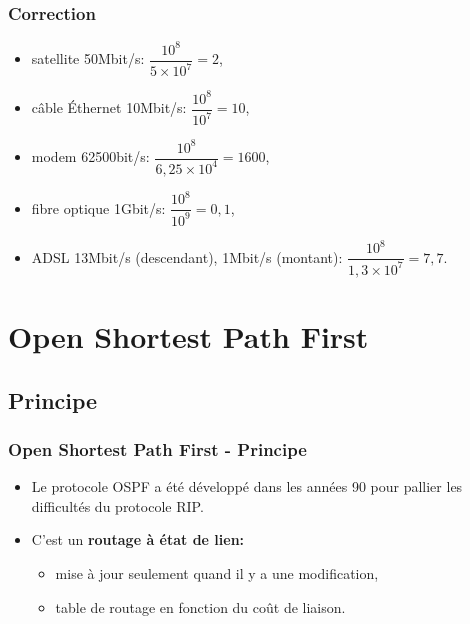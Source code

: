 \documentclass[svgnames,11pt]{beamer}
\begin{document}
\begin{frame}
    \frametitle{Correction}

    \begin{itemize}
        \item satellite 50Mbit/s: $\dfrac{10^8}{5×10^7}=2$,
        \item câble Éthernet 10Mbit/s: $\dfrac{10^8}{10^7}=10$,
        \item modem 62500bit/s: $\dfrac{10^8}{6,25×10^4}=1600$,
        \item fibre optique 1Gbit/s: $\dfrac{10^8}{10^9}=0,1$,
        \item ADSL 13Mbit/s (descendant), 1Mbit/s (montant): $\dfrac{10^8}{1,3×10^7}=7,7$.
    \end{itemize}
\end{frame}
\section{Open Shortest Path First}
\subsection{Principe}
\begin{frame}
    \frametitle{Open Shortest Path First - Principe}

    \begin{itemize}
        \item<1-> Le protocole OSPF a été développé dans les années 90 pour pallier les difficultés du protocole RIP.
        \item<2-> C'est un \textbf{routage à état de lien:}\begin{itemize}
            \item mise à jour seulement quand il y a une modification,
            \item table de routage en fonction du coût de liaison. 
        \end{itemize}
    \end{itemize}

\end{frame}
\end{document}
